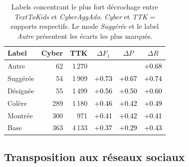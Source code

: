 \begin{table}[htbp]
  \centering
  \small
  \setlength{\tabcolsep}{4pt}
  \begin{tabular}{lrrccc}
    \toprule
    \textbf{Label} & \textbf{Cyber} & \textbf{TTK} & \textbf{$\Delta F_1$} & \textbf{$\Delta P$} & \textbf{$\Delta R$} \\
    \midrule
    Autre & 62 & 1\,270 & \cellcolor[HTML]{E4602C}\textcolor{white}{+0.76} & \cellcolor[HTML]{E25727}\textcolor{white}{+0.78} & \cellcolor[HTML]{E97B39}\textcolor{black}{+0.68} \\
    Suggérée & 54 & 1\,909 & \cellcolor[HTML]{E5682F}\textcolor{black}{+0.73} & \cellcolor[HTML]{E97C3A}\textcolor{black}{+0.67} & \cellcolor[HTML]{E5642D}\textcolor{black}{+0.74} \\
    Désignée & 55 & 1\,499 & \cellcolor[HTML]{EFA24F}\textcolor{black}{+0.56} & \cellcolor[HTML]{F1B55B}\textcolor{black}{+0.50} & \cellcolor[HTML]{ED9447}\textcolor{black}{+0.60} \\
    Colère & 289 & 1\,180 & \cellcolor[HTML]{F0CB66}\textcolor{black}{+0.46} & \cellcolor[HTML]{EEDD6F}\textcolor{black}{+0.42} & \cellcolor[HTML]{F1BA5D}\textcolor{black}{+0.49} \\
    Montrée & 300 & 971 & \cellcolor[HTML]{EEE172}\textcolor{black}{+0.41} & \cellcolor[HTML]{EEDF71}\textcolor{black}{+0.42} & \cellcolor[HTML]{EEE373}\textcolor{black}{+0.41} \\
    Base & 363 & 4\,133 & \cellcolor[HTML]{E4EC7F}\textcolor{black}{+0.37} & \cellcolor[HTML]{CBEA92}\textcolor{black}{+0.29} & \cellcolor[HTML]{EEDC6F}\textcolor{black}{+0.43} \\
    \bottomrule
  \end{tabular}
  \caption{Labels concentrant le plus fort décrochage entre \textit{TextToKids} et \textit{CyberAggAdo}. \textit{Cyber} et \textit{TTK} = supports respectifs. Le mode \textit{Suggérée} et le label \textit{Autre} présentent les écarts les plus marqués.}
  \label{tab:heatmap-decrochage}
\end{table}

\FloatBarrier

\subsection*{Transposition aux réseaux sociaux}

